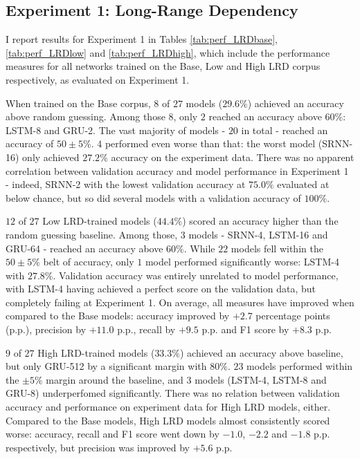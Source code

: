 \subsection{Experiment 1: Long-Range Dependency}\label{resultsLRD}
I report results for Experiment 1 in Tables \ref{tab:perf_LRDbase}, \ref{tab:perf_LRDlow} and \ref{tab:perf_LRDhigh}, which include the performance measures for all networks trained on the Base, Low and High LRD corpus respectively, as evaluated on Experiment 1.



When trained on the Base corpus, $8$ of $27$ models ($29.6\%$) achieved an accuracy above random guessing. Among those $8$, only $2$ reached an accuracy above $60\%$: LSTM-8 and GRU-2. The vast majority of models - $20$ in total - reached an accuracy of $50 \pm 5\%$. $4$ performed even worse than that: the worst model (SRNN-16) only achieved $27.2\%$ accuracy on the experiment data. There was no apparent correlation between validation accuracy and model performance in Experiment 1 - indeed, SRNN-2 with the lowest validation accuracy at $75.0\%$ evaluated at below chance, but so did several models with a validation accuracy of $100\%$.



$12$ of $27$ Low LRD-trained models ($44.4\%$) scored an accuracy higher than the random guessing baseline. Among those, $3$ models - SRNN-4, LSTM-16 and GRU-64 - reached an accuracy above $60\%$. While $22$ models fell within the $50 \pm 5\%$ belt of accuracy, only $1$ model performed significantly worse: LSTM-4 with $27.8\%$. Validation accuracy was entirely unrelated to model performance, with LSTM-4 having achieved a perfect score on the validation data, but completely failing at Experiment 1. On average, all measures have improved when compared to the Base models: accuracy improved by $+2.7$ percentage points (p.p.), precision by $+11.0$ p.p., recall by $+9.5$ p.p. and F1 score by $+8.3$ p.p.



$9$ of $27$ High LRD-trained models ($33.3\%$) achieved an accuracy above baseline, but only GRU-512 by a significant margin with $80\%$. $23$ models performed within the $\pm 5\%$ margin around the baseline, and $3$ models (LSTM-4, LSTM-8 and GRU-8) underperfomed significantly. There was no relation between validation accuracy and performance on experiment data for High LRD models, either. Compared to the Base models, High LRD models almost consistently scored worse: accuracy, recall and F1 score went down by $-1.0$, $-2.2$ and $-1.8$ p.p. respectively, but precision was improved by $+5.6$ p.p.

